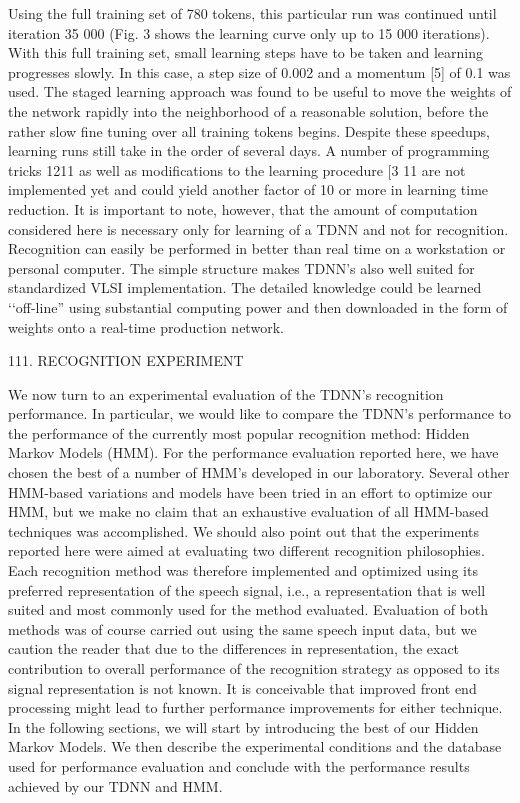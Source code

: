 Using the full training set of 780 tokens, this particular run was continued until iteration 35 000 (Fig. 3 shows the learning curve only up to 15 000 iterations).
With this full training set, small learning steps have to be taken and learning progresses slowly. 
In this case, a step size of 0.002 and a momentum [5] of 0.1 was used. 
The staged learning approach was found to be useful to move the weights of the network rapidly into the neighborhood of a reasonable
solution, before the rather slow fine tuning over all training tokens begins.
Despite these speedups, learning runs still take in the order of several days. 
A number of programming tricks 1211 as well as modifications to the learning procedure [3 11 are not implemented yet and could yield another factor of 10 or more in learning time reduction. 
It is important to note, however, that the amount of computation considered here is necessary only for learning of a TDNN and not for recognition. 
Recognition can easily be performed in better than real time on a workstation or personal computer. 
The simple structure makes TDNN’s also well suited for standardized VLSI implementation. 
The detailed knowledge could be learned ‘‘off-line” using substantial computing power and then downloaded in the form of weights onto a real-time production network.



111. RECOGNITION EXPERIMENT

We now turn to an experimental evaluation of the TDNN’s recognition performance. 
In particular, we would like to compare the TDNN’s performance to the performance of the currently most popular recognition method: Hidden Markov Models (HMM). 
For the performance evaluation reported here, we have chosen the best of a number of HMM’s developed in our laboratory. 
Several other HMM-based variations and models have been tried in an effort to optimize our HMM, but we make no claim that an exhaustive evaluation of all HMM-based techniques was accomplished. 
We should also point out that the experiments reported here were aimed at evaluating two different recognition philosophies. 
Each recognition method was therefore implemented and optimized using its preferred representation of the speech signal, i.e., a representation that is well suited and most commonly used for the method evaluated. 
Evaluation of both methods was of course carried out using the same speech input data, but we caution the reader that due to the differences in representation, the exact contribution to overall performance of the recognition strategy as opposed to its signal representation is not known. 
It is conceivable that improved front end processing might lead to further performance improvements for either technique. 
In the following sections, we will start by introducing the best of our Hidden Markov Models. 
We then describe the experimental conditions and the database used for performance evaluation and conclude with the performance results achieved by our TDNN and HMM.


